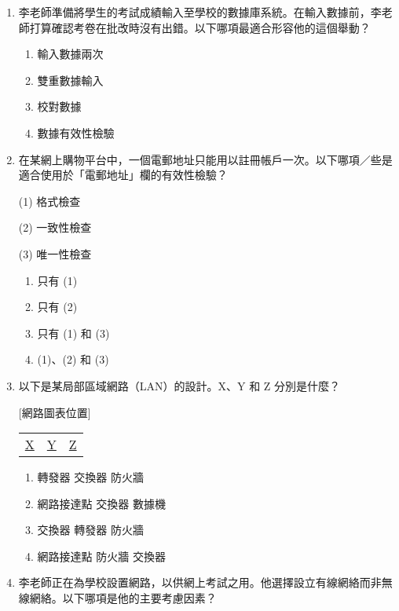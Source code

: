 \documentclass[12pt,a4paper]{article}
\begin{document}
\begin{enumerate}
\item 李老師準備將學生的考試成績輸入至學校的數據庫系統。在輸入數據前，李老師打算確認考卷在批改時沒有出錯。以下哪項最適合形容他的這個舉動？

\begin{enumerate}[label=\Alph*.]
\item 輸入數據兩次
\item 雙重數據輸入
\item 校對數據
\item 數據有效性檢驗
\end{enumerate}

\item 在某網上購物平台中，一個電郵地址只能用以註冊帳戶一次。以下哪項／些是適合使用於「電郵地址」欄的有效性檢驗？

(1) 格式檢查

(2) 一致性檢查

(3) 唯一性檢查

\begin{enumerate}[label=\Alph*.]
\item 只有 (1)
\item 只有 (2)
\item 只有 (1) 和 (3)
\item (1)、(2) 和 (3)
\end{enumerate}

\item 以下是某局部區域網路（LAN）的設計。X、Y 和 Z 分別是什麼？

[網路圖表位置]

\begin{center}
\begin{tabular}{ccc}
\underline{X} & \underline{Y} & \underline{Z} \\
\end{tabular}
\end{center}

\begin{enumerate}[label=\Alph*.]
\item 轉發器 \quad 交換器 \quad 防火牆
\item 網路接達點 \quad 交換器 \quad 數據機
\item 交換器 \quad 轉發器 \quad 防火牆
\item 網路接達點 \quad 防火牆 \quad 交換器
\end{enumerate}

\item 李老師正在為學校設置網路，以供網上考試之用。他選擇設立有線網絡而非無線網絡。以下哪項是他的主要考慮因素？


\end{enumerate}
\end{document}
